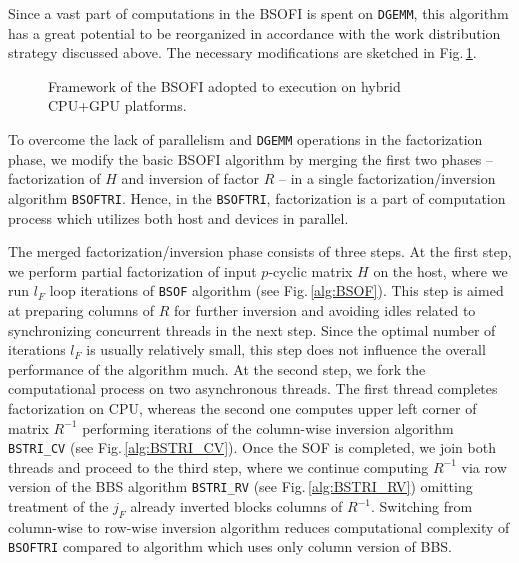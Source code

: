 \documentclass{llncs}
\newcommand{\Bsof}{\texttt{BSOF}\xspace}
\newcommand{\Bsoftri}{\texttt{BSOFTRI}\xspace}
\newcommand{\Bsoi}{\texttt{BSOI}\xspace}
\begin{document}
Since 
a vast part of computations in the BSOFI is spent on {\tt DGEMM},
this algorithm has a great potential to be reorganized 
in accordance with the work distribution strategy discussed above.
The necessary modifications are 
sketched %
in Fig.\,\ref{fig:BSOFI_HostDevice}. 
\begin{figure}[t]%
  \scalebox{0.75}{
    
  }
  \caption{Framework of the BSOFI
    adopted to execution on hybrid CPU+GPU platforms.%
    \label{fig:BSOFI_HostDevice}}
\end{figure}
To overcome the lack of parallelism and {\tt DGEMM} operations 
in the factorization phase,  %
we modify the basic BSOFI algorithm 
by merging the first two phases -- 
factorization of $H$ and inversion of factor $R$ -- 
in a single factorization/inversion algorithm \Bsoftri. 
Hence, in the \Bsoftri,
factorization is a part of computation process which
utilizes both host and devices in parallel.

The merged factorization/inversion phase consists of three steps.
At the first step, 
we perform partial factorization of input $p$-cyclic matrix $H$ 
on the host, where we run $l_F$ loop iterations 
of \Bsof algorithm (see Fig.\,\ref{alg:BSOF}).
This step is aimed at preparing columns of $R$ for further inversion and 
avoiding idles related to synchronizing concurrent threads in the next step.
Since the optimal number of iterations $l_F$ is usually relatively small,
this step does not influence the overall performance of the algorithm much.
At the second step, 
we fork the computational process on two asynchronous threads.
The first thread completes factorization on CPU,  
whereas the second one computes upper left corner of matrix $R^{-1}$
performing iterations of the column-wise inversion 
algorithm {\tt BSTRI\_CV} (see Fig.\,\ref{alg:BSTRI_CV}).
Once the SOF is completed, 
we join both threads and proceed to the third step,
where we continue computing $R^{-1}$
via row version of the BBS algorithm {\tt BSTRI\_RV} (see Fig.\,\ref{alg:BSTRI_RV})
omitting treatment of the $j_F$ already inverted blocks columns of $R^{-1}$.
Switching from column-wise to row-wise inversion algorithm 
reduces computational complexity of \Bsoftri 
compared to algorithm which uses only column version of BBS.
\end{document}
